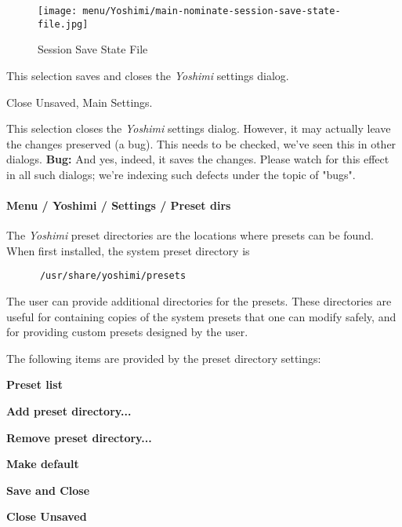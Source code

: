 \begin{figure}[H]
   \centering 
   \texttt{[image: menu/Yoshimi/main-nominate-session-save-state-file.jpg]}
   \caption[Session Save State]{Session Save State File}
   \label{fig:session_save_state} 
\end{figure}

   This selection saves and closes the \textsl{Yoshimi} settings dialog.

   Close Unsaved, Main Settings.

   This selection closes the \textsl{Yoshimi} settings dialog.
   However, it may actually leave the changes preserved (a bug).
   This needs to be checked, we've seen this in other dialogs.
   \textbf{Bug:}
   And yes, indeed, it saves the changes.
   Please watch for this effect in all such dialogs; we're indexing such
   defects under the topic of "bugs".

\paragraph{Menu / Yoshimi / Settings / Preset dirs}
\label{paragraph:menu_yoshimi_settings_preset_dirs}

   The \textsl{Yoshimi} preset directories are the locations where
   presets can be found.  When first installed, the system
   preset directory is

   \begin{verbatim}
      /usr/share/yoshimi/presets
   \end{verbatim}
   
   The user can provide additional directories for the presets.
   These directories are useful for containing copies of the system
   presets that one can modify safely, and for providing custom
   presets designed by the user.

   The following items are provided by the preset directory settings:

   \begin{enumber}
      \item \textbf{Preset list}
      \item \textbf{Add preset directory...}
      \item \textbf{Remove preset directory...}
      \item \textbf{Make default}
      \item \textbf{Save and Close}
      \item \textbf{Close Unsaved}
   \end{enumber}

